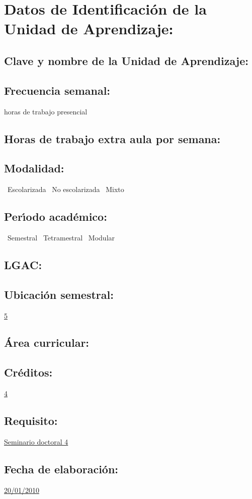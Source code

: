 \documentclass[10 pt]{article}
\begin{document}


\section{Datos de Identificaci\'{o}n de la Unidad de Aprendizaje:}
\subsection{Clave y nombre de la Unidad de Aprendizaje:} 
\subsection{Frecuencia semanal:} horas de trabajo presencial 
\subsection{Horas de trabajo extra aula por semana:} 
\subsection{Modalidad:} \yes~Escolarizada \no~No escolarizada \no~Mixto
\subsection{Per\'{\i}odo acad\'{e}mico:} \yes~Semestral
\no~Tetramestral \no~Modular
\subsection{LGAC:} \underline{\odsi}
\subsection{Ubicaci\'{o}n semestral:} \underline{5}
\subsection{\'{A}rea curricular:} \underline{\fr}
\subsection{Cr\'{e}ditos:} \underline{4}
\subsection{Requisito:} \underline{Seminario doctoral 4}
\subsection{Fecha de elaboraci\'{o}n:} \underline{20/01/2010}
\end{document}
